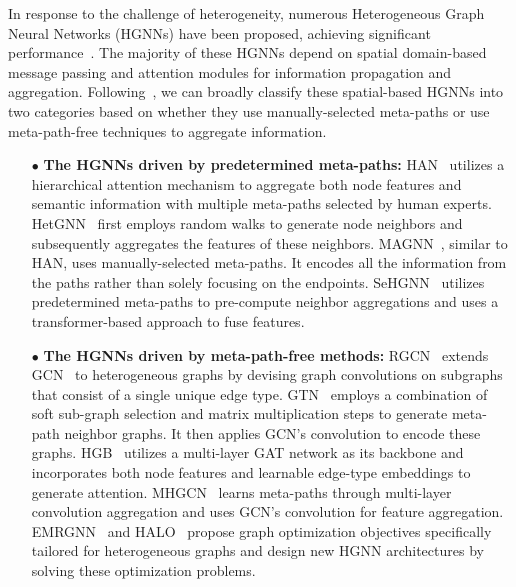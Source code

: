 \documentclass{article}
\begin{document}
In response to the challenge of heterogeneity, numerous Heterogeneous Graph Neural Networks (HGNNs) have been proposed, achieving significant performance~\cite{han,magnn,mhgcn,halo}.  The majority of these HGNNs depend on spatial domain-based message passing and attention modules for information propagation and aggregation.
Following~\cite{sehgnn}, we can broadly classify these spatial-based HGNNs into two categories based on whether they use manually-selected meta-paths or use meta-path-free techniques to aggregate information.







\begin{enumerate}
    \item[$\bullet$] \textbf{The HGNNs driven by predetermined meta-paths:} 
     HAN~\cite{han} utilizes a hierarchical attention mechanism to aggregate both node features and semantic information with multiple meta-paths selected by human experts. 
     HetGNN~\cite{hetgnn} first employs random walks to generate node neighbors and subsequently aggregates the features of these neighbors.
     MAGNN~\cite{magnn}, similar to HAN, uses manually-selected meta-paths. It encodes all the information from the paths rather than solely focusing on the endpoints.
     SeHGNN~\cite{sehgnn} utilizes predetermined meta-paths to pre-compute neighbor aggregations and uses a transformer-based approach to fuse features.
     


   
    \item[$\bullet$] \textbf{The HGNNs driven by meta-path-free methods:} 
    RGCN~\cite{rgcn} extends GCN~\cite{gcn} to heterogeneous graphs by devising graph convolutions on subgraphs that consist of a single unique edge type. 
    GTN~\cite{gtn} employs a combination of soft sub-graph selection and matrix multiplication steps to generate meta-path neighbor graphs. It then applies GCN's convolution to encode these graphs.
    HGB~\cite{hgb} utilizes a multi-layer GAT network as its backbone and incorporates both node features and learnable edge-type embeddings to generate attention. 
    MHGCN~\cite{mhgcn} learns meta-paths through multi-layer convolution aggregation and uses GCN's convolution for feature aggregation.
    EMRGNN~\cite{emrgnn} and HALO~\cite{halo} propose graph optimization objectives specifically tailored for heterogeneous graphs and design new HGNN architectures by solving these optimization problems.
\end{enumerate}
\end{document}
